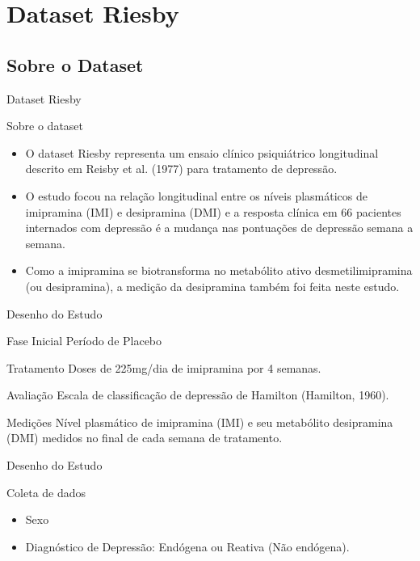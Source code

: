 \section{Dataset Riesby}
\subsection{Sobre o Dataset}
\begin{frame}{Dataset Riesby}
    \begin{block}{Sobre o dataset}
    	\begin{itemize}
    		\justifying
    		\item O dataset Riesby representa um ensaio clínico psiquiátrico longitudinal descrito em Reisby et al. (1977) para tratamento de depressão.
    		\item O estudo focou na relação longitudinal entre os níveis plasmáticos de imipramina (IMI) e desipramina (DMI) e a resposta clínica em 66 pacientes internados com depressão é a mudança nas pontuações de depressão semana a semana.
    		\item Como a imipramina se biotransforma no metabólito ativo desmetilimipramina (ou desipramina), a medição da desipramina também foi feita neste estudo.
    	\end{itemize}
    \end{block}
\end{frame}

\begin{frame}{Desenho do Estudo}
	\begin{block}{Fase Inicial}
		Período de Placebo 
	\end{block}
	\begin{block}{Tratamento}
		Doses de 225mg/dia de imipramina por 4 semanas.
	\end{block}
	\begin{block}{Avaliação}
		Escala de classificação de depressão de Hamilton (Hamilton, 1960).
	\end{block}
	\begin{block}{Medições}
		Nível plasmático de imipramina (IMI) e seu metabólito desipramina (DMI) medidos no final de cada semana de tratamento.
	\end{block}
\end{frame}

\begin{frame}{Desenho do Estudo}
	\begin{block}{Coleta de dados}
		\begin{itemize}
			\item Sexo
			\item Diagnóstico de Depressão: Endógena ou Reativa (Não endógena).
		\end{itemize}
	\end{block}
\end{frame}

